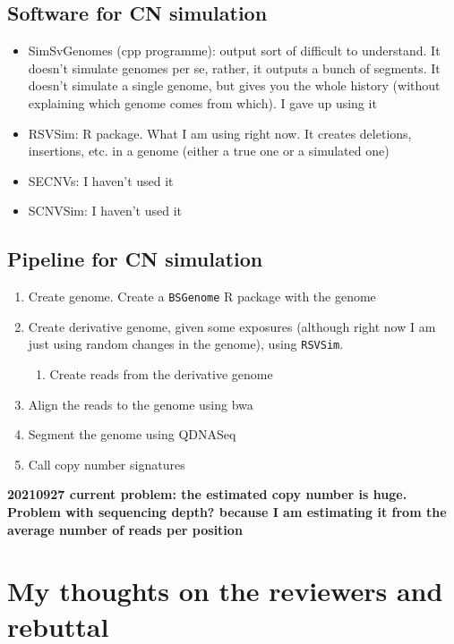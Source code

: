\documentclass[11pt,a4paper,roman]{article}
\begin{document}
\subsection{Software for CN simulation}
\begin{itemize}
\item SimSvGenomes (cpp programme): output sort of difficult to understand. It doesn't simulate genomes per se, rather, it outputs a bunch of segments. It doesn't simulate a single genome, but gives you the whole history (without explaining which genome comes from which). I gave up using it
\item RSVSim: R package. What I am using right now. It creates deletions, insertions, etc. in a genome (either a true one or a simulated one)
\item SECNVs: I haven't used it
\item SCNVSim: I haven't used it
\end{itemize}

\clearpage
\subsection{Pipeline for CN simulation}
\begin{enumerate}
\item Create genome. Create a \verb|BSGenome| R package with the genome
\item Create derivative genome, given some exposures (although right now I am just using random changes in the genome), using \verb|RSVSim|.
\begin{enumerate}
\item Create reads from the derivative genome
\end{enumerate}
\item Align the reads to the genome using bwa
\item Segment the genome using QDNASeq
\item Call copy number signatures
\end{enumerate}


\textbf{20210927 current problem: the estimated copy number is huge. Problem with sequencing depth? because I am estimating it from the average number of reads per position}


\section{My thoughts on the reviewers and rebuttal}
\end{document}
